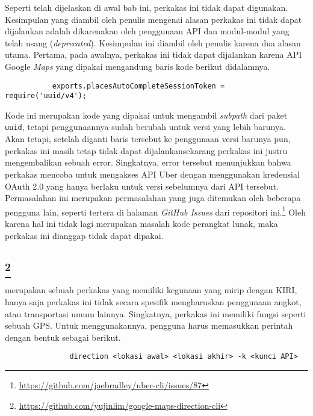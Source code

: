 Seperti telah dijelaskan di awal bab ini, perkakas ini tidak dapat digunakan. Kesimpulan yang diambil oleh penulis mengenai alasan perkakas ini tidak dapat dijalankan adalah dikarenakan oleh penggunaan API dan modul-modul yang telah usang (\textit{deprecated}). Kesimpulan ini diambil oleh penulis karena dua alasan utama. Pertama, pada awalnya, perkakas ini tidak dapat dijalankan karena API Google \textit{Maps} yang dipakai mengandung baris kode berikut didalamnya.

\begin{verbatim}
           exports.placesAutoCompleteSessionToken = require('uuid/v4');
\end{verbatim}

Kode ini merupakan kode yang dipakai untuk mengambil \textit{subpath} dari paket \verb|uuid|, tetapi penggunaannya sudah berubah untuk versi yang lebih barunya. Akan tetapi, setelah diganti baris tersebut ke penggunaan versi barunya pun, perkakas ini masih tetap tidak dapat dijalankan\textemdash sekarang perkakas ini justru mengembalikan sebuah error. Singkatnya, error tersebut menunjukkan bahwa perkakas mencoba untuk mengakses API Uber dengan menggunakan kredensial OAuth 2.0 yang hanya berlaku untuk versi sebelumnya dari API tersebut. Permasalahan ini merupakan permasalahan yang juga ditemukan oleh beberapa pengguna lain, seperti tertera di halaman \textit{GitHub Issues} dari repositori ini.\footnote{\href{https://github.com/jaebradley/uber-cli/issues/87}{https://github.com/jaebradley/uber-cli/issues/87}} Oleh karena hal ini tidak lagi merupakan masalah kode perangkat lunak, maka perkakas ini dianggap tidak dapat dipakai.

\subsection{\googlemapscli\footnote{\href{https://github.com/yujinlim/google-maps-direction-cli}{https://github.com/yujinlim/google-maps-direction-cli}}}
\label{sec:similarapps-googlemapscli}

\googlemapscli merupakan sebuah perkakas \cl yang memiliki kegunaan yang mirip dengan KIRI, hanya saja perkakas ini tidak secara spesifik mengharuskan penggunaan angkot, atau transportasi umum lainnya. Singkatnya, perkakas ini memiliki fungsi seperti sebuah GPS. Untuk menggunakannya, pengguna harus memasukkan perintah dengan bentuk sebagai berikut.

\begin{verbatim}
               direction <lokasi awal> <lokasi akhir> -k <kunci API>
\end{verbatim}

